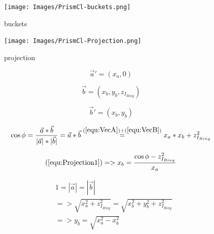 \documentclass[../ClassicThesis.tex]{subfiles}
\begin{document}
\begin{figure}
    \texttt{[image: Images/PrismCl-buckets.png]}
    \caption{buckets}
    \label{fig:PrismCl-buckets}
\end{figure}


\begin{figure}
    \texttt{[image: Images/PrismCl-Projection.png]}
    \caption{projection}
    \label{fig:projection}
\end{figure}




\begin{equation}
    \label{equ:VecAStrich}
    \vec{a}' = (x_{a}, 0)
\end{equation}

\begin{equation}
    \vec{b} = (x_{b}, y_{b}, z_{I_{Ring}})
    \label{equ:VecB}
\end{equation}

\begin{equation}
    \vec{b}' = (x_{b}, y_{b})
    \label{equ:VecBStrich}
\end{equation}

\begin{equation}
    \label{equ:Projection1}
    \cos{\phi} = \frac{\vec{a} * \vec{b}}{|\vec{a}| * |\vec{b}|} = \vec{a} * \vec{b} \stackrel{(\ref{equ:VecA}) + (\ref{equ:VecB})}{=} x_{a} * x_{b} + z_{I_{Ring}}^{2}
\end{equation}

\begin{equation}
    \label{equ:XB}
   (\ref{equ:Projection1}) => x_{b} = \frac{ \cos{\phi} - z_{I_{Ring}}^{2} }{ x_{a} }
\end{equation}

\begin{equation}
\begin{split}
    \label{equ:YpsilonB}
    & 1 = |\vec{a}| = |\vec{b}| \\
    & => \sqrt{ x_{a}^{2} + z_{I_{Ring}}^{2} } = \sqrt{ x_{b}^{2} + y_{b}^{2} + z_{I_{Ring}}^{2} } \\
    & => y_{b} = \sqrt{ x_{a}^{2} - x_{b}^{2} }
\end{split}
\end{equation}
\end{document}
